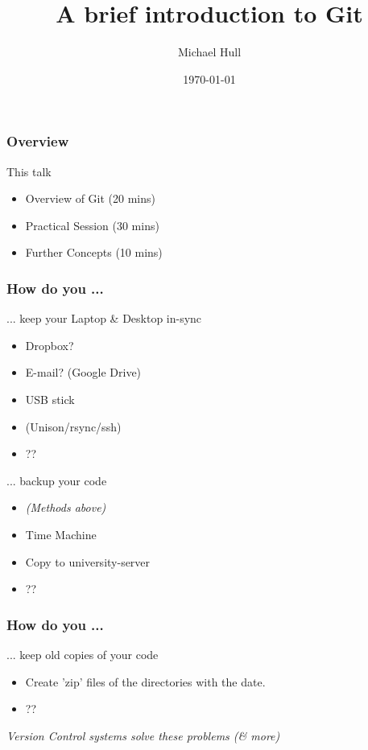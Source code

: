 \documentclass{beamer}
\title[A brief introduction to Git]{A brief introduction to Git}
\author{Michael Hull}
\institute[University of Edinburgh]
{
University of Edinburgh \\
\medskip
{\emph{mikehulluk@googlemail.com}}
}
\date{\today}
\begin{document}
\begin{frame}
\titlepage
\end{frame}


\begin{frame}
\frametitle{Overview}
\begin{block}
{This talk}
\begin{itemize}
\item Overview of Git (20 mins)
\item Practical Session (30 mins)
\item Further Concepts (10 mins)
\end{itemize}
\end{block}
\end{frame}



\begin{frame}
\frametitle{How do you ...}

\begin{block}
{ ... keep your Laptop \& Desktop in-sync}
\begin{itemize}
\item Dropbox?
\item E-mail? (Google Drive)
\item USB stick
\item (Unison/rsync/ssh)
\item ??
\end{itemize}
\end{block}

\pause

\begin{block}
{... backup your code}
\begin{itemize}
\item \emph{(Methods above)} 
\item Time Machine 
\item Copy to university-server
\item ??
\end{itemize}
\end{block}

\end{frame}



\begin{frame}
\frametitle{How do you ...}
\begin{block}
{... keep old copies of your code}	
\begin{itemize}
\item Create 'zip' files of the directories with the date. 
\item ??
\end{itemize}
\end{block}

\pause

\begin{block}
{ \emph{Version Control systems solve these problems (\& more)}	}
\end{block}




\end{frame}
\end{document}
